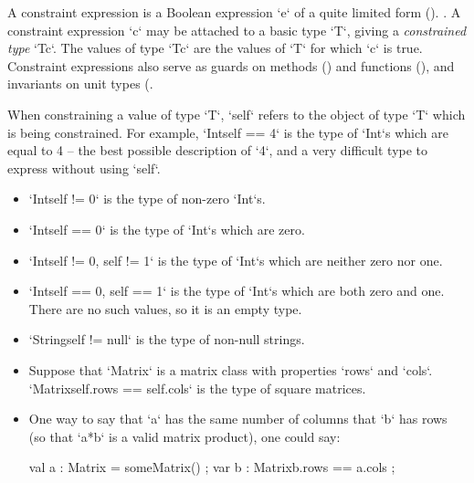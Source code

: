 A constraint expression is a Boolean expression \xcd`e` of a quite limited
form (). . A
constraint expression \xcd`c` may be attached to a basic type \xcd`T`, giving
a {\em constrained type} \xcd`T{c}`. The values of type \xcd`T{c}` are the
values of \xcd`T` for which \xcd`c` is true.
Constraint expressions also serve as guards on methods ()
and functions (), and
invariants on unit types (.

When constraining a value of type \xcd`T`, \xcd`self` refers to the object of
type \xcd`T` which is being constrained.  For example, \xcd`Int{self == 4}` is
the type of \xcd`Int`s which are equal to 4 -- the best possible description
of \xcd`4`, and a very difficult type to express without using \xcd`self`.  


\begin{ex}

\begin{itemize}
\item \xcd`Int{self != 0}` is the type of non-zero \xcd`Int`s. 
\item \xcd`Int{self == 0}` is the type of \xcd`Int`s which are zero.  
\item \xcd`Int{self != 0, self != 1}` is the type of \xcd`Int`s which are
      neither zero nor one.
\item \xcd`Int{self == 0, self == 1}` is the type of \xcd`Int`s which are both
      zero and one.  There are no such values, so it is an empty type. 
\item \xcd`String{self != null}` is the type of non-null strings. 
\item Suppose that \xcd`Matrix` is a matrix class with  properties \xcd`rows`
      and \xcd`cols`.  
      \xcd`Matrix{self.rows == self.cols}` is the type of square matrices.
\item One way to say that \xcd`a` has the same number of columns that \xcd`b`
      has rows (so that \xcd`a*b` is a valid matrix product), one could say: 
\begin{xten}
  val a : Matrix = someMatrix() ;
  var b : Matrix{b.rows == a.cols} ;
\end{xten}
\end{itemize}
\end{ex}



